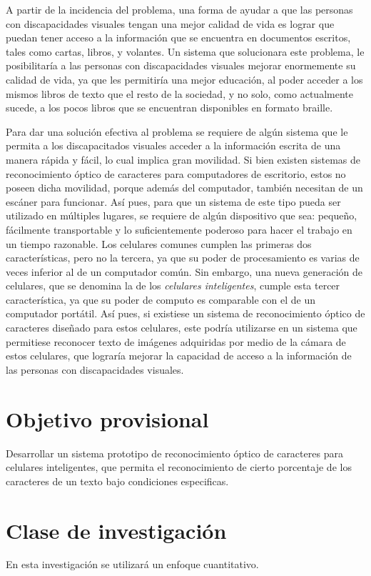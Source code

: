 \documentclass[a4paper, 11pt, oneside]{article}
\begin{document}
	A partir de la incidencia del problema, una forma de ayudar a que las personas con discapacidades visuales tengan una mejor calidad de vida es lograr que puedan tener acceso a la información que se encuentra en documentos escritos, tales como cartas, libros, y volantes. Un sistema que solucionara este problema, le posibilitaría a las personas con discapacidades visuales mejorar enormemente su calidad de vida, ya que les permitiría una mejor educación, al poder acceder a los mismos libros de texto que el resto de la sociedad, y no solo, como actualmente sucede, a los pocos libros que se encuentran disponibles en formato braille.

	Para dar una solución efectiva al problema se requiere de algún sistema que le permita a los discapacitados visuales acceder a la información escrita de una manera rápida y fácil, lo cual implica gran movilidad. Si bien existen sistemas de reconocimiento óptico de caracteres para computadores de escritorio, estos no poseen dicha movilidad, porque además del computador, también necesitan de un escáner para funcionar. Así pues, para que un sistema de este tipo pueda ser utilizado en múltiples lugares, se requiere de algún dispositivo que sea: pequeño, fácilmente transportable y lo suficientemente poderoso para hacer el trabajo en un tiempo razonable. Los celulares comunes cumplen las primeras dos características, pero no la tercera, ya que su poder de procesamiento es varias de veces inferior al de un computador común. Sin embargo, una nueva generación de celulares, que se denomina la de los \textit{celulares inteligentes}, cumple esta tercer característica, ya que su poder de computo es comparable con el de un computador portátil. Así pues, si existiese un sistema de reconocimiento óptico de caracteres diseñado para estos celulares, este podría utilizarse en un sistema que permitiese reconocer texto de imágenes adquiridas por medio de la cámara de estos celulares, que lograría mejorar la capacidad de acceso a la información de las personas con discapacidades visuales.
	\clearpage
	\section{Objetivo provisional}
	Desarrollar un sistema prototipo de reconocimiento óptico de caracteres para celulares inteligentes, que permita el reconocimiento de cierto porcentaje de los caracteres de un texto bajo condiciones especificas.
	\clearpage
	\section{Clase de investigación}
	En esta investigación se utilizará un enfoque cuantitativo. 
	\clearpage
\end{document}
